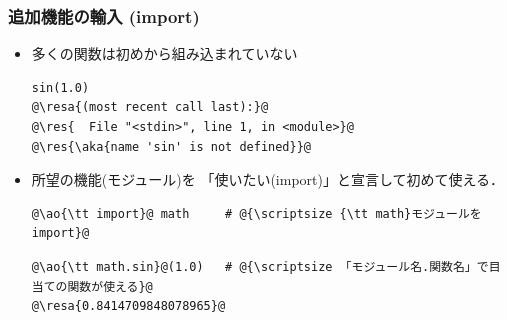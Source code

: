 \documentclass[10pt,dvipdfmx]{beamer}
\newcommand{\ore}[1]{{\color{orange}#1}}
\newcommand{\ao}[1]{{\color{blue}#1}}
\newcommand{\aka}[1]{{\color{red}#1}}
\newcommand{\resa}[1]{\ore{\textsl{$\rightarrow$ #1}}}
\newcommand{\res}[1]{\ore{\textsl{#1}}}
\begin{document}
\begin{frame}[fragile]
\frametitle{追加機能の輸入 (import)}
\begin{itemize}
\item 多くの関数は初めから組み込まれていない
\begin{lstlisting}
sin(1.0)
@\resa{(most recent call last):}@
@\res{  File "<stdin>", line 1, in <module>}@
@\res{\aka{name 'sin' is not defined}}@
\end{lstlisting}

\item 所望の機能(\ao{モジュール})を
「使いたい(\ao{import})」と宣言して初めて使える．
\begin{lstlisting}
@\ao{\tt import}@ math     # @{\scriptsize {\tt math}モジュールをimport}@
\end{lstlisting}
\begin{lstlisting}
@\ao{\tt math.sin}@(1.0)   # @{\scriptsize 「モジュール名.関数名」で目当ての関数が使える}@
@\resa{0.8414709848078965}@
\end{lstlisting}
\end{itemize}
\end{frame}
\end{document}
